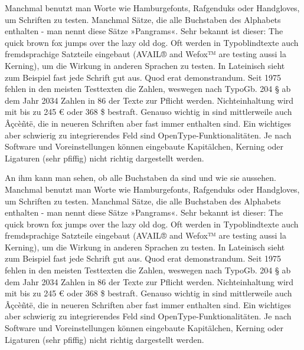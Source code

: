 \documentclass[
a5paper,
10pt, 
onecolumn,
openany,
]{memoir}
\begin{document}
Manchmal benutzt man Worte wie Hamburgefonts, Rafgenduks oder Handgloves, um Schriften zu testen. Manchmal Sätze, die alle Buchstaben des Alphabets enthalten - man nennt diese Sätze »Pangrams«. Sehr bekannt ist dieser: The quick brown fox jumps over the lazy old dog. Oft werden in Typoblindtexte auch fremdsprachige Satzteile eingebaut (AVAIL® and Wefox™ are testing aussi la Kerning), um die Wirkung in anderen Sprachen zu testen. In Lateinisch sieht zum Beispiel fast jede Schrift gut aus. Quod erat demonstrandum. Seit 1975 fehlen in den meisten Testtexten die Zahlen, weswegen nach TypoGb. 204 § ab dem Jahr 2034 Zahlen in 86 der Texte zur Pflicht werden. Nichteinhaltung wird mit bis zu 245 € oder 368 \$ bestraft. Genauso wichtig in sind mittlerweile auch Âçcèñtë, die in neueren Schriften aber fast immer enthalten sind. Ein wichtiges aber schwierig zu integrierendes Feld sind OpenType-Funktionalitäten. Je nach Software und Voreinstellungen können eingebaute Kapitälchen, Kerning oder Ligaturen (sehr pfiffig) nicht richtig dargestellt werden.

An ihm kann man sehen, ob alle Buchstaben da sind und wie sie aussehen. Manchmal benutzt man Worte wie Hamburgefonts, Rafgenduks oder Handgloves, um Schriften zu testen. Manchmal Sätze, die alle Buchstaben des Alphabets enthalten - man nennt diese Sätze »Pangrams«. Sehr bekannt ist dieser: The quick brown fox jumps over the lazy old dog. Oft werden in Typoblindtexte auch fremdsprachige Satzteile eingebaut (AVAIL® and Wefox™ are testing aussi la Kerning), um die Wirkung in anderen Sprachen zu testen. In Lateinisch sieht zum Beispiel fast jede Schrift gut aus. Quod erat demonstrandum. Seit 1975 fehlen in den meisten Testtexten die Zahlen, weswegen nach TypoGb. 204 § ab dem Jahr 2034 Zahlen in 86 der Texte zur Pflicht werden. Nichteinhaltung wird mit bis zu 245 € oder 368 \$ bestraft. Genauso wichtig in sind mittlerweile auch Âçcèñtë, die in neueren Schriften aber fast immer enthalten sind. Ein wichtiges aber schwierig zu integrierendes Feld sind OpenType-Funktionalitäten. Je nach Software und Voreinstellungen können eingebaute Kapitälchen, Kerning oder Ligaturen (sehr pfiffig) nicht richtig dargestellt werden.

\mainmatter





\cleartooddpage
 
\thispagestyle{empty}
\listoffigures
\cleartooddpage
\end{document}
